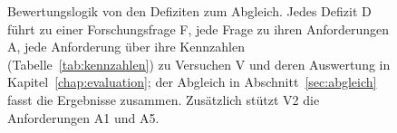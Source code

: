 \begin{figure}[htbp]
  \centering
  
  \caption[Bewertungslogik von den Defiziten zum Abgleich]{Bewertungslogik von den Defiziten zum Abgleich. Jedes Defizit D führt zu einer Forschungsfrage F, jede Frage zu ihren Anforderungen A, jede Anforderung über ihre Kennzahlen (Tabelle~\ref{tab:kennzahlen}) zu Versuchen V und deren Auswertung in Kapitel~\ref{chap:evaluation}; der Abgleich in Abschnitt~\ref{sec:abgleich} fasst die Ergebnisse zusammen. Zusätzlich stützt V2 die Anforderungen A1 und A5.}
  \label{fig:bewertungslogik}
\end{figure}
